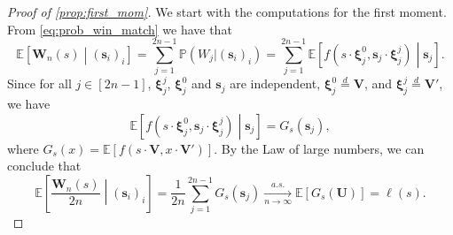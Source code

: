 \documentclass[11pt,a4paper,oneside]{article}
\theoremstyle{definition}
\theoremstyle{remark}
\def\E{\mathbb{E}}
\def\P{\mathbb{P}}
\begin{document}
\begin{proof}[Proof of \cref{prop:first_mom}]
	We start with the computations for the first moment. From \cref{eq:prob_win_match} we have that
	\begin{equation}\label{eq:evfwryibfweonfpiwe}
		\E\left[\bm W_n(s)\middle| (\bm s_i)_i\right]=\sum_{j=1}^{2n-1}\P(W_j| (\bm s_i)_i)=\sum_{j=1}^{2n-1}\E\left[f\left(s\cdot \bm \xi^{0}_j,\bm s_j\cdot \bm \xi^j_j\right)\middle| \bm s_j\right].
	\end{equation}
	Since for all $j\in [2n-1]$, $\bm \xi^j_j$, $\bm \xi^{0}_j$ and $\bm s_j$ are independent, $\bm \xi^{0}_j\stackrel{d}{=}\bm V$, and $\bm \xi^j_j\stackrel{d}{=}\bm V'$, we have
	\begin{equation}
		\E\left[f\left(s\cdot \bm \xi^{0}_j,\bm s_j\cdot \bm \xi^j_j\right)\middle| \bm s_j\right]=G_s\left(\bm s_j\right),
	\end{equation}
	where $G_s(x)=\E\left[f\left(s\cdot \bm V,x\cdot \bm V'\right)\right]$.
	By the Law of large numbers, we can conclude that
	\begin{equation}\label{eq:evfwuitgwrefbwofnwryibfweonfpiwe}
		\E\left[\frac{\bm W_n(s)}{2n}\middle| (\bm s_i)_i\right]=\frac{1}{2n}\sum_{j=1}^{2n-1}G_s\left(\bm s_j\right)
		\xrightarrow[n\to\infty]{a.s.} \E\left[G_s\left(\bm U\right)\right]=\ell(s).
	\end{equation}






\end{proof}
\end{document}

